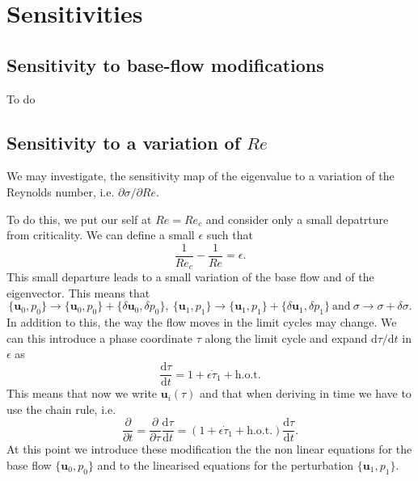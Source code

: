 \section{Sensitivities}

\subsection{Sensitivity to base-flow modifications}

To do

\subsection{Sensitivity to a variation of $Re$}

We may investigate, the sensitivity map of the eigenvalue to a variation of the Reynolds number, i.e. $\partial \sigma/\partial Re$.

To do this, we put our self at $Re = Re_c$ and consider only a small depatrture from criticality. We can define a small $\epsilon$ such that
%
\begin{equation}
  \frac{1}{Re_c} - \frac{1}{Re} = \epsilon.
\end{equation}
%
This small departure leads to a small variation of the base flow and of the eigenvector. This means that
%
\begin{equation}
  \{ \bm{u}_0, p_0 \} \rightarrow \{ \bm{u}_0, p_0 \} + \{\delta \bm{u}_0,\delta p_0\}, \ \{ \bm{u}_1, p_1 \} \rightarrow \{ \bm{u}_1, p_1 \}  + \{\delta \bm{u}_1,\delta p_1\}\ \text{and} \ \sigma \rightarrow \sigma + \delta \sigma.
\end{equation}
%
In addition to this, the way the flow moves in the limit cycles may change. We can this introduce a phase coordinate $\tau$ along the limit cycle and expand $\text{d}\tau/\text{d}t$ in $\epsilon$ as
%
\begin{equation}
  \frac{\text{d} \tau}{\text{d} t} = 1 + \epsilon \dot{\tau}_1 +  \text{h.o.t}.
\end{equation}
%
This means that now we write $\bm{u}_i(\tau)$ and that when deriving in time we have to use the chain rule, i.e.
%
\begin{equation}
  \frac{\partial}{\partial t} = \frac{\partial}{\partial \tau} \frac{\text{d} \tau}{\text{d} t} = ( 1 + \epsilon \dot{\tau}_1 + \text{h.o.t.} ) \frac{\text{d} \tau}{\text{d} t}.
\end{equation} 
%
At this point we introduce these modification the the non linear equations for the base flow $\{\bm{u}_0,p_0\}$ and to the linearised equations for the perturbation $\{\bm{u}_1,p_1\}$.

